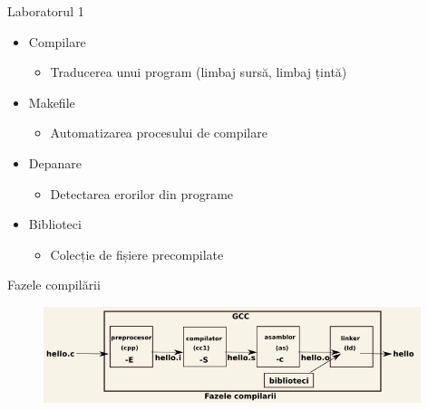 \documentclass{so.cs.pub.ro}
\begin{document}
\begin{frame}{Laboratorul 1}
	\begin{itemize}
		\item Compilare
		\begin{itemize}
			\item Traducerea unui program (limbaj sursă, limbaj țintă)
		\end{itemize}
		\item {Makefile}
		\begin{itemize}
			\item Automatizarea procesului de compilare
		\end{itemize}
		\item Depanare
		\begin{itemize}
			\item Detectarea erorilor din programe
		\end{itemize}
		\item Biblioteci
		\begin{itemize}
			\item Colecție de fișiere precompilate
		\end{itemize}
	\end{itemize}
\end{frame}

\begin{frame}{Fazele compilării}
	\begin{figure}[htb]
		\includegraphics[width=11cm]{code/compilation-phases.png}
	\end{figure}
\end{frame}
\end{document}
